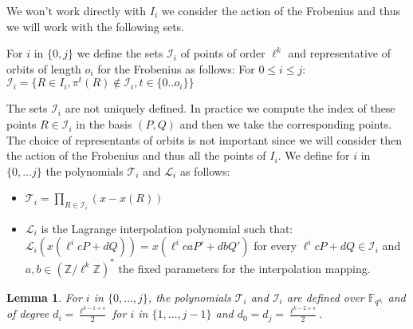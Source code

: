 \documentclass{lms}
\newtheorem{lem}[thm]{Lemma}
\begin{document}
We won't work directly with $I_i$ we consider the action of the Frobenius and thus we will work with the following sets.
\newline
\begin{defi}
For $i$ in $\{0,j\}$ we define the sets
$\mathcal{I}_i$ of points of order $\ell^k$ and representative of orbits of length $o_i$ for the Frobenius as follows:
\newline
For $0 \leqslant i \leqslant j $:
$\mathcal{I}_i=\{ R \in I_i, \pi^t(R) \notin \mathcal{I}_i, t \in \{0.. o_i\} \} $ 
\end{defi}
The sets $\mathcal{I}_i$ are not uniquely defined. In practice we compute the index of these points $R \in \mathcal{I}_i$ in the basis $(P,Q)$ and then we take the corresponding points. The choice of representants of orbits is not important since we will consider then the action of the Frobenius and thus all the points of $I_i$.
\newline
We define for $i$ in $\{0,\dots j\}$ the polynomials
$\mathcal{T}_i$ and $\mathcal{L}_i$ as follows:
\begin{itemize}
\item $\mathcal{T}_i= \prod_{R \in \mathcal{I}_i} (x-x(R))$
\item $\mathcal{L}_i$ is the Lagrange interpolation polynomial such that: $\mathcal{L}_i(x(\ell^i c P + d Q))=x(\ell^i c aP' + d b Q')$ for every  $ \ell^i c P + d Q  \in \mathcal{I}_i$ and $a,b \in \left( \mathbb{Z}/ \ell^k \mathbb{Z} \right)^{*}$ the fixed parameters for the interpolation mapping.
\end{itemize}

\begin{lem}
  For $i$ in $\{0, \dots,j\}$, the
  polynomials $\mathcal{T}_i$ and $\mathcal{I}_i$ are defined over
  $\mathbb{F}_{q^{o_i}}$ and of degree $d_i=\frac{\ell^{k-1+s}}{2}$ for $i$ in $\{1, \dots,j-1\}$ and $d_0=d_j=\frac{\ell^{k-2+s}}{2}$.
\end{lem}
\end{document}
